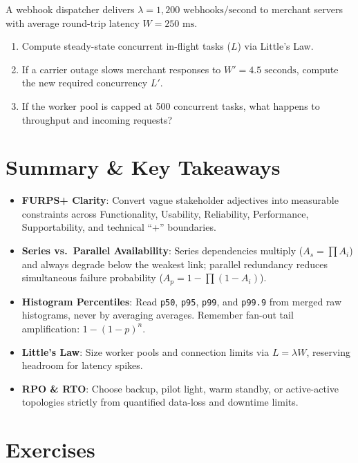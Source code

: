 \begin{tryityourselfbox}
A webhook dispatcher delivers $\lambda = 1,200\text{ webhooks/second}$ to merchant servers with average round-trip latency $W = 250\text{ ms}$.
\begin{enumerate}
  \item Compute steady-state concurrent in-flight tasks ($L$) via Little's Law.
  \item If a carrier outage slows merchant responses to $W' = 4.5\text{ seconds}$, compute the new required concurrency $L'$.
  \item If the worker pool is capped at 500 concurrent tasks, what happens to throughput and incoming requests?
\end{enumerate}
\end{tryityourselfbox}

\section{Summary \protect\& Key Takeaways}

\begin{itemize}[leftmargin=18pt]
  \item \textbf{FURPS+ Clarity}: Convert vague stakeholder adjectives into measurable constraints across Functionality, Usability, Reliability, Performance, Supportability, and technical ``+'' boundaries.
  \item \textbf{Series vs.\ Parallel Availability}: Series dependencies multiply ($A_s = \prod A_i$) and always degrade below the weakest link; parallel redundancy reduces simultaneous failure probability ($A_p = 1 - \prod (1 - A_i)$).
  \item \textbf{Histogram Percentiles}: Read \texttt{p50}, \texttt{p95}, \texttt{p99}, and \texttt{p99.9} from merged raw histograms, never by averaging averages. Remember fan-out tail amplification: $1 - (1 - p)^n$.
  \item \textbf{Little's Law}: Size worker pools and connection limits via $L = \lambda W$, reserving headroom for latency spikes.
  \item \textbf{RPO \& RTO}: Choose backup, pilot light, warm standby, or active-active topologies strictly from quantified data-loss and downtime limits.
\end{itemize}

\section{Exercises}

